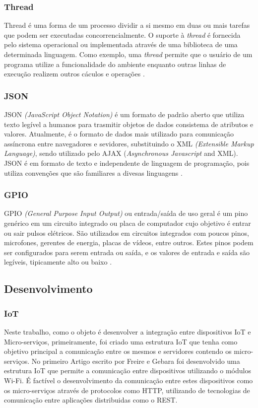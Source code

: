 \documentclass[journal]{IEEEtran}
\begin{document}
\subsubsection{Thread}
Thread é uma forma de um processo dividir a si mesmo em duas ou mais tarefas que podem ser executadas concorrencialmente. O suporte à \emph{thread} é fornecida pelo sistema operacional ou implementada através de uma biblioteca de uma determinada linguagem. Como exemplo, uma \emph{thread} permite que o usuário de um programa utilize a funcionalidade do ambiente enquanto outras linhas de execução realizem outros cáculos e operações \cite{tecmundothread}.

\subsubsection{JSON}
JSON \emph{(JavaScript Object Notation)} é um formato de padrão aberto que utiliza texto legível a humanos para trasmitir objetos de dados consistema de atributos e valores. Atualmente, é o formato de dados mais utilizado para comunicação assíncrona entre navegadores e sevidores, substituindo o XML \emph{(Extensible Markup Language)}, sendo utilizado pelo AJAX (\emph{Asynchronous Javascript} and XML). JSON é em formato de texto e independente de linguagem de programação, pois utiliza convenções que são familiares a divesas linguagens \cite{jsonpt}.

\subsubsection{GPIO}

GPIO \emph{(General Purpose Input Output)} ou entrada/saída de uso geral é um pino genérico em um circuito integrado ou placa de computador cujo objetivo é entrar ou sair pulsos elétricos. São utilizados em circuitos integrados com poucos pinos, microfones, gerentes de energia, placas de vídeos, entre outros. Estes pinos podem ser configurados para serem entrada ou saída, e os valores de entrada e saída são legíveis, tipicamente alto ou baixo \cite[p.~3]{Sasang}.

\subsection{Desenvolvimento}
\subsubsection{IoT}

Neste trabalho, como o objeto é desenvolver a integração entre dispositivos IoT e Micro-serviços, primeiramente, foi criado uma estrutura IoT que tenha como objetivo principal a comunicação entre os mesmos e servidores contendo os micro-serviços. No primeiro Artigo escrito por Freire e Gebara \cite{freiregebaraiot} foi desenvolvido uma estrutura IoT que permite a comunicação entre dispositivos utilizando o módulos Wi-Fi. É factível o desenvolvimento da comunicação entre estes dispositivos como os micro-serviços através de protocolos como HTTP, utilizando de tecnologias de comunicação entre aplicações distribuidas como o REST.
\end{document}

